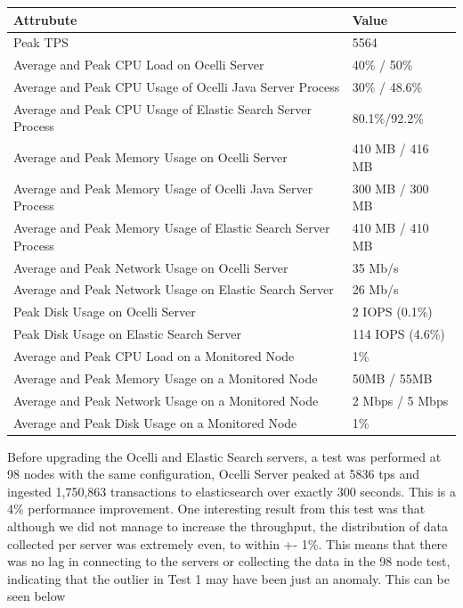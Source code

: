 \documentclass{llncs}
\begin{document}
\begin{flushleft}
    \begin{tabular}{ | l | l |}
    \hline
  Attrubute & Value  \\ \hline
  Peak TPS & 5564  \\ \hline
  Average and Peak CPU Load on Ocelli Server & 40\% / 50\%  \\ \hline
  Average and Peak CPU Usage of Ocelli Java Server Process & 30\% / 48.6\% \\ \hline
 Average and Peak CPU Usage of Elastic Search Server Process & 80.1\%/92.2\%	  \\ \hline
  Average and Peak Memory Usage on Ocelli Server & 410 MB / 416 MB	 \\ \hline
  Average and Peak Memory Usage of Ocelli Java Server Process &	300 MB / 300 MB		 \\ \hline
 Average and Peak Memory Usage of Elastic Search Server Process &	410 MB / 410 MB		 \\ \hline
Average and Peak Network Usage on Ocelli Server &	35 Mb/s 	 \\ \hline
Average and Peak Network Usage on Elastic Search Server & 26 Mb/s 	 \\ \hline
Peak Disk Usage on Ocelli Server &	2 IOPS (0.1\%)		 \\ \hline
Peak Disk Usage on Elastic Search Server &	114 IOPS (4.6\%)		 \\ \hline
Average and Peak CPU Load on a Monitored Node& 	1\% 	 \\ \hline
  Average and Peak Memory Usage on a Monitored Node &	50MB / 55MB	 \\ \hline
Average and Peak Network Usage on a Monitored Node &	2 Mbps / 5 Mbps		 \\ \hline
  Average and Peak Disk Usage on a Monitored Node &  1\%	\\ 
    \hline
    \end{tabular}
\end{flushleft}

Before upgrading the Ocelli and Elastic Search servers, a test was performed at 98 nodes with the same configuration, Ocelli Server peaked at 5836 tps and ingested 1,750,863 transactions to elasticsearch over exactly 300 seconds. This is a 4\% performance improvement. One interesting result from this test was that although we did not manage to increase the throughput, the distribution of data collected per server was extremely even, to within +- 1\%. This means that there was no lag in connecting to the servers or collecting the data in the 98 node test, indicating that the outlier in Test 1 may have been just an anomaly. This can be seen below
\end{document}
